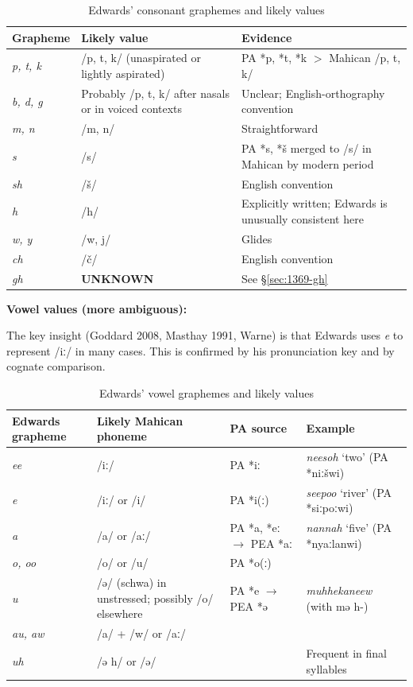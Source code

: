 \begin{table}[h]
\centering
\begin{tabular}{lll}
\toprule
\textbf{Grapheme} & \textbf{Likely value} & \textbf{Evidence} \\
\midrule
\textit{p, t, k} & /p, t, k/ (unaspirated or lightly aspirated) & PA *p, *t, *k $>$ Mahican /p, t, k/ \\
\textit{b, d, g} & Probably /p, t, k/ after nasals or in voiced contexts & Unclear; English-orthography convention \\
\textit{m, n} & /m, n/ & Straightforward \\
\textit{s} & /s/ & PA *s, *š merged to /s/ in Mahican by modern period \\
\textit{sh} & /š/ & English convention \\
\textit{h} & /h/ & Explicitly written; Edwards is unusually consistent here \\
\textit{w, y} & /w, j/ & Glides \\
\textit{ch} & /č/ & English convention \\
\textit{gh} & \textbf{UNKNOWN} & See \S\ref{sec:1369-gh} \\
\bottomrule
\end{tabular}
\caption{Edwards' consonant graphemes and likely values}
\label{tab:1369-consonants}
\end{table}

\textbf{Vowel values (more ambiguous):}

The key insight (Goddard 2008, Masthay 1991, Warne) is that Edwards uses
\textit{e} to represent /iː/ in many cases. This is confirmed by his
pronunciation key and by cognate comparison.

\begin{table}[h]
\centering
\begin{tabular}{llll}
\toprule
\textbf{Edwards grapheme} & \textbf{Likely Mahican phoneme} & \textbf{PA source} & \textbf{Example} \\
\midrule
\textit{ee} & /iː/ & PA *iː & \textit{neesoh} `two' (PA *niːšwi) \\
\textit{e} & /iː/ or /i/ & PA *i(ː) & \textit{seepoo} `river' (PA *siːpoːwi) \\
\textit{a} & /a/ or /aː/ & PA *a, *eː $\rightarrow$ PEA *aː & \textit{nannah} `five' (PA *nyaːlanwi) \\
\textit{o, oo} & /o/ or /u/ & PA *o(ː) & \\
\textit{u} & /ə/ (schwa) in unstressed; possibly /o/ elsewhere & PA *e $\rightarrow$ PEA *ə & \textit{muhhekaneew} (with mə h-) \\
\textit{au, aw} & /a/ + /w/ or /aː/ & & \\
\textit{uh} & /ə h/ or /ə/ & & Frequent in final syllables \\
\bottomrule
\end{tabular}
\caption{Edwards' vowel graphemes and likely values}
\label{tab:1369-vowels}
\end{table}

